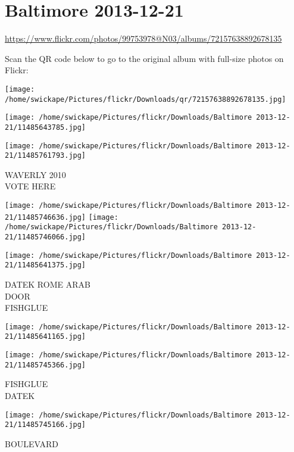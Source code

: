 \documentclass[10pt,letterpaper]{article}
\title{}
\author{}
\date{}
\begin{document}
\section*{Baltimore 2013-12-21}

\url{https://www.flickr.com/photos/99753978@N03/albums/72157638892678135}

Scan the QR code below to go to the original album with full-size photos on Flickr:

\texttt{[image: /home/swickape/Pictures/flickr/Downloads/qr/72157638892678135.jpg]}
\pagebreak

\texttt{[image: /home/swickape/Pictures/flickr/Downloads/Baltimore 2013-12-21/11485643785.jpg]}

\vspace{0.25in}
\texttt{[image: /home/swickape/Pictures/flickr/Downloads/Baltimore 2013-12-21/11485761793.jpg]}

WAVERLY 2010\\
VOTE HERE
\pagebreak

\texttt{[image: /home/swickape/Pictures/flickr/Downloads/Baltimore 2013-12-21/11485746636.jpg]}
\texttt{[image: /home/swickape/Pictures/flickr/Downloads/Baltimore 2013-12-21/11485746066.jpg]}

\texttt{[image: /home/swickape/Pictures/flickr/Downloads/Baltimore 2013-12-21/11485641375.jpg]}

DATEK ROME ARAB\\
DOOR\\
FISHGLUE
\pagebreak

\texttt{[image: /home/swickape/Pictures/flickr/Downloads/Baltimore 2013-12-21/11485641165.jpg]}

\vspace{0.25in}
\texttt{[image: /home/swickape/Pictures/flickr/Downloads/Baltimore 2013-12-21/11485745366.jpg]}

FISHGLUE\\
DATEK
\pagebreak

\texttt{[image: /home/swickape/Pictures/flickr/Downloads/Baltimore 2013-12-21/11485745166.jpg]}

BOULEVARD
\pagebreak
\end{document}
